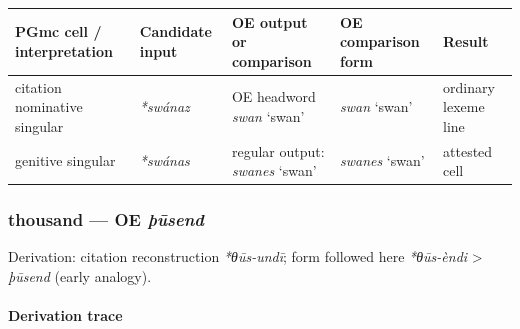 \documentclass[
  british,
  a4paper,
]{article}
\newcounter{none} %
\begin{document}
{\def\LTcaptype{none} %
\begin{longtable}[]{@{}
  >{\raggedright\arraybackslash}p{}
  >{\raggedright\arraybackslash}p{}
  >{\raggedright\arraybackslash}p{}
  >{\raggedright\arraybackslash}p{}
  >{\raggedright\arraybackslash}p{}@{}}
\toprule\noalign{}
\begin{minipage}[b]{\linewidth}\raggedright
PGmc cell / interpretation
\end{minipage} & \begin{minipage}[b]{\linewidth}\raggedright
Candidate input
\end{minipage} & \begin{minipage}[b]{\linewidth}\raggedright
OE output or comparison
\end{minipage} & \begin{minipage}[b]{\linewidth}\raggedright
OE comparison form
\end{minipage} & \begin{minipage}[b]{\linewidth}\raggedright
Result
\end{minipage} \\
\midrule\noalign{}
\endhead
\bottomrule\noalign{}
\endlastfoot
citation nominative singular & {\emph{*swánaz}} & OE headword
{\emph{swan}} `swan' & {\emph{swan}} `swan' & ordinary lexeme line \\
genitive singular & {\emph{*swánas}} & regular output: {\emph{swanes}}
`swan' & {\emph{swanes}} `swan' & attested cell \\
\end{longtable}
}

\subsubsection{\texorpdfstring{thousand --- OE
\emph{þūsend}}{thousand --- OE þūsend}}\label{thousand-oe-uxfeux16bsend}

Derivation: citation reconstruction \emph{*θūs-undī}; form followed here
\emph{*θūs-èndi} \textgreater{} \emph{þūsend} (early analogy).

\paragraph{Derivation trace}\label{derivation-trace-113}
\end{document}
